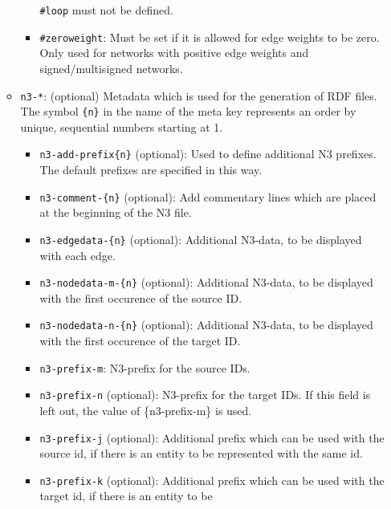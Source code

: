 \documentclass{article}
\begin{document}
\begin{itemize}
\begin{itemize}
\begin{itemize}
          \texttt{\#loop} must not be defined. 
        \item \texttt{\#zeroweight}:  Must be set if it is allowed for edge
          weights to be zero. Only used for networks with positive edge
          weights and signed/multisigned networks. 
        \end{itemize}
      \item \texttt{n3-*}: (optional) Metadata which is used for the
        generation of RDF files. The symbol \texttt{\{n\}} in the name
        of the meta key represents an order by unique, sequential
        numbers starting at 1.
		\begin{itemize}
			\item \texttt{n3-add-prefix\{n\}} (optional):
                          Used to define additional N3 prefixes. The
                          default prefixes are specified in this way.
			\item \texttt{n3-comment-\{n\}} (optional): Add
                          commentary lines which are placed at the
                          beginning of the N3 file.
			\item \texttt{n3-edgedata-\{n\}} (optional):
                          Additional N3-data, to be displayed with each
                          edge.
			\item \texttt{n3-nodedata-m-\{n\}} (optional):
                          Additional N3-data, to be displayed with the
                          first occurence of the source ID.
			\item \texttt{n3-nodedata-n-\{n\}} (optional):
                          Additional N3-data, to be displayed with the
                          first occurence of the target ID.
			\item \texttt{n3-prefix-m}: N3-prefix for the
                          source IDs.
			\item \texttt{n3-prefix-n} (optional): N3-prefix
                          for the target IDs. If this field is left out,
                          the value of \{n3-prefix-m\} is used.
			\item \texttt{n3-prefix-j} (optional):
                          Additional prefix which can be used with the
                          source id, if there is an entity to be
                          represented with the same id.
			\item \texttt{n3-prefix-k} (optional):
                          Additional prefix which can be used with the
                          target id, if there is an entity to be

\end{itemize}
\end{itemize}
\end{itemize}
\end{document}
